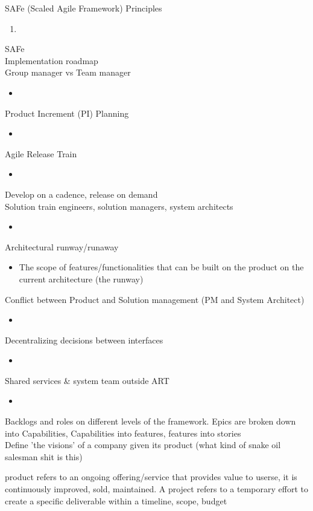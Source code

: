 \documentclass[10pt]{article}
\begin{document}
SAFe (Scaled Agile Framework) Principles
\begin{enumerate}
\item 
\end{enumerate}
SAFe\\
Implementation roadmap\\
Group manager vs Team manager
\begin{itemize}
\item 
\end{itemize}
Product Increment (PI) Planning
\begin{itemize}
\item 
\end{itemize}
Agile Release Train
\begin{itemize}
\item 
\end{itemize}
Develop on a cadence, release on demand\\
Solution train engineers, solution managers, system architects
\begin{itemize}
\item 
\end{itemize}
Architectural runway/runaway
\begin{itemize}
\item The scope of features/functionalities that can be built on the product on the current architecture (the runway)
\end{itemize}
Conflict between Product and Solution management (PM and System Architect)
\begin{itemize}
\item 
\end{itemize}
Decentralizing decisions between interfaces
\begin{itemize}
\item 
\end{itemize}
Shared services \& system team outside ART
\begin{itemize}
\item 
\end{itemize}
Backlogs and roles on different levels of the framework. Epics are broken down into Capabilities, Capabilities into features, features into stories\\
Define 'the visions' of a company given its product (what kind of snake oil salesman shit is this)

product refers to an ongoing offering/service that provides value to userse, it is continuously improved, sold, maintained. A project refers to a temporary effort to create a specific deliverable within a timeline, scope, budget
\end{document}
